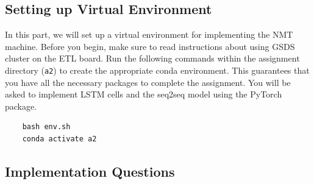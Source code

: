 \documentclass{assignment format}
\begin{document}
\subsection{Setting up Virtual Environment}
In this part, we will set up a virtual environment for implementing the NMT machine. Before you begin, make sure to read instructions about using GSDS cluster on the ETL board. Run the following commands within the assignment directory (\texttt{a2}) to create the appropriate conda environment. This guarantees that you have all the necessary packages to complete the assignment. You will be asked to implement LSTM cells and the seq2seq model using the PyTorch package. 
\begin{verbatim}
    bash env.sh
    conda activate a2
\end{verbatim}


\subsection{Implementation Questions}
\end{document}
